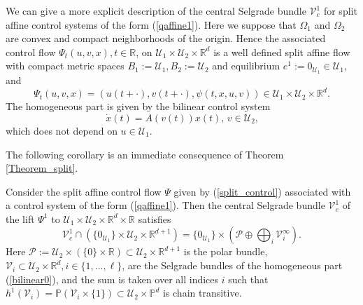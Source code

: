 	We can give a more explicit description of the central Selgrade bundle
	$\mathcal{V}_{c}^{1}$ for split affine control systems of the form
	(\ref{qaffine1}). Here we suppose that $\Omega_{1}$ and $\Omega_{2}$ are
	convex and compact neighborhoods of the origin. Hence the associated control
	flow $\Psi_{t}(u,v,x),t\in\mathbb{R}$, on $\mathcal{U}_{1}\times
	\mathcal{U}_{2}\times\mathbb{R}^{d}$ is a well defined split affine flow with
	compact metric spaces $B_{1}:=\mathcal{U}_{1},B_{2}:=\mathcal{U}_{2}$ and
	equilibrium $e^{1}:=0_{\mathcal{U}_{1}}\in\mathcal{U}_{1}$, and
	\begin{equation}
		\Psi_{t}(u,v,x)=(u(t+\cdot),v(t+\cdot),\psi(t,x,u,v))\in\mathcal{U}_{1}%
		\times\mathcal{U}_{2}\times\mathbb{R}^{d}. \label{split_control}%
	\end{equation}
	The homogeneous part is given by the bilinear control system
	\begin{equation}
		\dot{x}(t)=A(v(t))x(t),\,v\in\mathcal{U}_{2}\mbox{,} \label{bilinear0}%
	\end{equation}
	which does not depend on $u\in\mathcal{U}_{1}$.
	
	The following corollary is an immediate consequence of Theorem
	\ref{Theorem_split}.
	
	\begin{corollary}
		\label{Corollary_split}Consider the split affine control flow $\Psi$ given by
		(\ref{split_control}) associated with a control system of the form
		(\ref{qaffine1}). Then the central Selgrade bundle $\mathcal{V}_{c}^{1}$ of
		the lift $\Psi^{1}$ to $\mathcal{U}_{1}\times\mathcal{U}_{2}\times
		\mathbb{R}^{d}\times\mathbb{R}$ satisfies
		\[
		\mathcal{V}_{c}^{1}\cap\left(  \{0_{\mathcal{U}_{1}}\}\times\mathcal{U}%
		_{2}\times\mathbb{R}^{d+1}\right)  =\{0_{\mathcal{U}_{1}}\}\times\left(
		\mathcal{P}\oplus\bigoplus\nolimits_{i}\mathcal{V}_{i}^{\infty}\right)  .
		\]
		Here $\mathcal{P}:=\mathcal{U}_{2}\times\left(  \{0\}\times\mathbb{R}\right)
		\subset\mathcal{U}_{2}\times\mathbb{R}^{d+1}$ is the polar bundle,
		$\mathcal{V}_{i}\subset\mathcal{U}_{2}\times\mathbb{R}^{d},i\in\{1,\ldots
		,\ell\}$, are the Selgrade bundles of the homogeneous part (\ref{bilinear0}),
		and the sum is taken over all indices $i$ such that $h^{1}(\mathcal{V}%
		_{i})=\mathbb{P}(\mathcal{V}_{i}\times\{1\})\subset\mathcal{U}_{2}%
		\times\mathbb{P}^{d}$ is chain transitive.
	\end{corollary}
	
